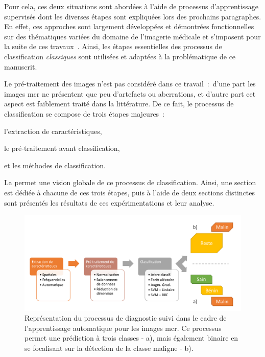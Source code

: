 Pour cela, ces deux situations sont abordées à l'aide de processus d'apprentissage supervisés dont les diverses étapes sont expliquées lors des prochains paragraphes. En effet, ces approches sont largement développées et démontrées fonctionnelles sur des thématiques variées du domaine de l'imagerie médicale et s'imposent pour la suite de ces travaux~\cite{Litjens2017,Pathan2018}. Ainsi, les étapes essentielles des processus de classification \textit{classiques} sont utilisées et adaptées à la problématique de ce manuscrit.\par

Le pré-traitement des images n'est pas considéré dans ce travail~:~d'une part les images \gls{mcr} ne présentent que peu d'artefacts ou aberrations, et d'autre part cet aspect est faiblement traité dans la littérature. De ce fait, le processus de classification se compose de trois étapes majeures~:
\begin{inlinerate}
    \item l'extraction de caractéristiques,
    \item le pré-traitement avant classification,
    \item et les méthodes de classification.
\end{inlinerate} La  permet une vision globale de ce processus de classification. Ainsi, une section est dédiée à chacune de ces trois étapes, puis à l'aide de deux sections distinctes sont présentés les résultats de ces expérimentations et leur analyse.\par

\begin{figure}[H]
\centering
    \includegraphics[width=\linewidth]{contents/chapter_5/resources/scheme_macro_image_classification.pdf}
    \caption{Représentation du processus de diagnostic suivi dans le cadre de l'apprentissage automatique pour les images \gls{mcr}. Ce processus permet une prédiction à trois classes - a), mais également binaire en se focalisant sur la détection de la classe maligne - b).}
    \label{fig:scheme_macro_image_classification}
\end{figure}\par

